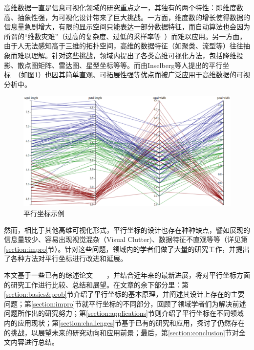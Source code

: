 \documentclass[12pt,twocolumn]{article}
\begin{document}
高维数据一直是信息可视化领域的研究重点之一，其独有的两个特性：即维度数高、抽象性强，为可视化设计带来了巨大挑战。一方面，维度数的增长使得数据的信息量急剧增大，有限的显示空间只能表达一部分数据特征，而自动算法也会因为所谓的“维数灾难”（过高的复杂度、过低的采样率等~\citep{Bellman1962}）而难以应用。另一方面，由于人无法感知高于三维的拓扑空间，高维的数据特征（如聚类、流型等）往往抽象而难以理解。针对这些挑战，领域内提出了各类高维可视化方法\citep{grinstein2001high}，包括降维投影\citep{fodor2002survey}、散点图矩阵\citep{cleveland1988dynamic}、雷达图\citep{hoffman1999dimensional}、星型坐标\citep{kandogan2000star}等等。而由Inselberg等人提出的平行坐标~\citep{inselberg1985plane}（如图\ref{fig:PC_demo}）也因其简单直观、可拓展性强等优点而被广泛应用于高维数据的可视分析中。

\begin{figure}[htb!]
\centering
\includegraphics[width=0.9\linewidth]{images/PC_demo.eps}
\caption{\label{fig:PC_demo}平行坐标示例
}
\end{figure}

然而，相比于其他高维可视化形式，平行坐标的设计也存在种种缺点，譬如展现的信息量较少、容易出现视觉混杂（Visual Clutter)、数据特征不直观等等（详见第\ref{section:impro}节）。针对这些问题，领域内的学者们做了大量的研究工作，并提出了各种方法对平行坐标进行改进和延展。

本文基于一些已有的综述论文~\citep{grinstein2001high}~\citep{heinrich2013state}~\citep{siirtola2006interacting}~\citep{wong199430}，并结合近年来的最新进展，将对平行坐标方面的研究工作进行比较、总结和展望。在文章的余下部分里：第\ref{section:basics&prob}节介绍了平行坐标的基本原理，并阐述其设计上存在的主要问题；第\ref{section:impro}节就平行坐标的不同部分，回顾了领域学者们为解决前述问题所作出的研究努力；第\ref{section:applications}节则介绍了平行坐标在不同领域内的应用现状；第\ref{section:challenges}节基于已有的研究和应用，探讨了仍然存在的挑战，以展望未来的研究动向和应用前景；最后，第\ref{section:conclusion}节对全文内容进行总结。
\end{document}

